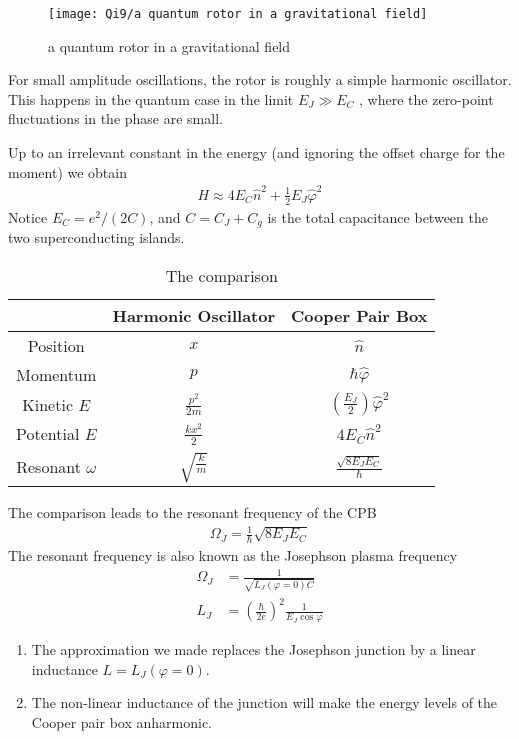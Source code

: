 \begin{figure}[!htb]
    \centering
    \texttt{[image: Qi9/a quantum rotor in a gravitational field]}
    \caption{a quantum rotor in a gravitational field}
\end{figure}

For small amplitude oscillations, the rotor is roughly a simple harmonic oscillator. This happens in the quantum case in the limit $E_J \gg E_C$ , where the zero-point fluctuations in the phase are small.

Up to an irrelevant constant in the energy (and ignoring the offset charge for the moment) we obtain
\begin{align*}
    H\approx 4E_C\hat{n}^2+\frac{1}{2}E_J\hat{\varphi}^2
\end{align*}
Notice $E_C = e^2/(2C)$, and $C = C_J + C_g$ is the total capacitance between the two superconducting islands.


\begin{table}[H]
    \centering
    \caption{The comparison}
    \begin{tabular}[c]{ccc}\hline
        & Harmonic Oscillator & Cooper Pair Box\\ \hline
        Position & $x$ & $\hat{n}$ \\
        Momentum & $p$ & $\hbar\hat{\varphi}$ \\
        Kinetic $E$ & $\displaystyle \frac{p^2}{2m}$ & $\displaystyle \left( \frac{E_J}{2} \right)\hat{\varphi}^2$ \\
        Potential $E$ & $\displaystyle\frac{k x^2}{2}$ & $4E_C\hat{n}^2$ \\
        Resonant $\omega$ & $\displaystyle\sqrt{\frac{k}{m}}$ & $\displaystyle \frac{\sqrt{8E_J E_C}}{\hbar}$ \\ \hline
    \end{tabular}
\end{table}


The comparison leads to the resonant frequency of the CPB
\begin{align*}
    \Omega_J=\frac{1}{\hbar}\sqrt{8E_J E_C}
\end{align*}
The resonant frequency is also known as the Josephson plasma frequency
\begin{align*}
    \Omega_J&= \frac{1}{\sqrt{L_J(\varphi=0)C}}\\
    L_J&=\left( \frac{\hbar}{2e} \right)^2\frac{1}{E_J \cos\varphi}
\end{align*}
\begin{enumerate}\small
    \item The approximation we made replaces the Josephson junction by a linear inductance $L = L_J (\varphi = 0)$.
    \item The non-linear inductance of the junction will make the energy levels of the Cooper pair box anharmonic.
\end{enumerate}

